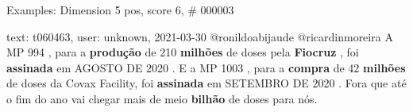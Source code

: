\begin{frame}{Examples: Dimension 5 pos, score 6, \# 000003}
\footnotesize
\begin{exampleblock}{text: t060463, user: unknown, 2021-03-30}
@ronildoabijaude @ricardinmoreira A MP 994 , para a \textbf{produção} de 210 
\textbf{milhões} de doses pela \textbf{Fiocruz} , foi \textbf{assinada} em 
AGOSTO DE 2020 . E a MP 1003 , para a \textbf{compra} de 42 \textbf{milhões} de 
doses da Covax Facility, foi \textbf{assinada} em SETEMBRO DE 2020 . Fora que 
até o fim do ano vai chegar mais de meio \textbf{bilhão} de doses para nós. 
\end{exampleblock}
\end{frame}
